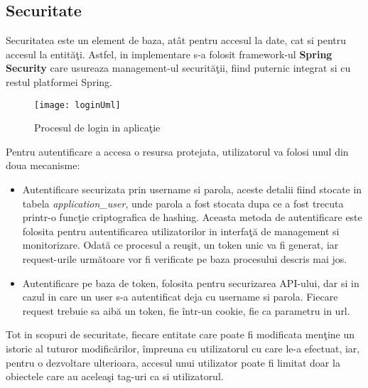 \subsection{Securitate}
Securitatea este un element de baza, atât pentru accesul la date, cat si pentru accesul la entităţi. Astfel, in implementare s-a folosit framework-ul \textbf{Spring Security} care usureaza management-ul securităţii, fiind puternic integrat si cu restul platformei Spring.
\begin{figure}[H]
	\centering
	\texttt{[image: loginUml]}
	\caption{Procesul de login in aplicaţie}
	\label{fig:loginUml}
\end{figure}
Pentru autentificare a accesa o resursa protejata, utilizatorul va folosi unul din doua mecanisme:
\begin{itemize}
	\item Autentificare securizata prin username si parola, aceste detalii fiind stocate in tabela \textit{application\_user}, unde parola a fost stocata dupa ce a fost trecuta printr-o funcţie criptografica de hashing. Aceasta metoda de autentificare este folosita pentru autentificarea utilizatorilor in interfaţă de management si monitorizare. Odată ce procesul a reuşit, un token unic va fi generat, iar request-urile următoare vor fi verificate pe baza procesului descris mai jos.
	\item Autentificare pe baza de token, folosita pentru securizarea API-ului, dar si in cazul in care un user s-a autentificat deja cu username si parola. Fiecare request trebuie sa aibă un token, fie într-un cookie, fie ca parametru in url.
\end{itemize}

Tot in scopuri de securitate, fiecare entitate care poate fi modificata menţine un istoric al tuturor modificărilor, împreuna cu utilizatorul cu care le-a efectuat, iar, pentru o dezvoltare ulterioara, accesul unui utilizator poate fi limitat doar la obiectele care au aceleaşi tag-uri ca si utilizatorul.
